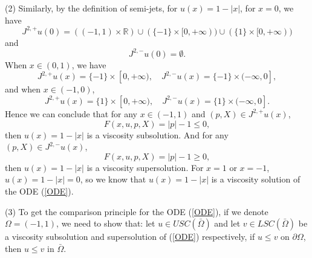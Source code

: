 \documentclass[12pt,a4paper]{ctexart}
\begin{document}
(2) Similarly, by the definition of semi-jets, for $u(x) = 1 - |x|$, for $x = 0$, we have
\begin{equation*}
    J^{2,+} u(0) = ((-1, 1) \times \mathbb{R}) \cup (\{-1 \} \times [0, + \infty)) \cup (\{1\} \times  [0, + \infty) )
\end{equation*}
and 
\begin{equation*}
    J^{2,-} u(0) = \emptyset.
\end{equation*}
When $x \in (0,1)$, we have
\begin{equation*}
    J^{2,+} u(x) = \{- 1\} \times [0, + \infty), \quad J^{2, -} u(x) = \{-1 \} \times (- \infty, 0],
\end{equation*}
and when $x \in (-1, 0)$, 
\begin{equation*}
    J^{2,+} u(x) = \{1\} \times [0, + \infty), \quad J^{2, -} u(x) = \{1 \} \times (- \infty, 0].
\end{equation*}
Hence we can conclude that for any $x \in (-1, 1)$ and $(p, X) \in J^{2,+} u(x)$,
\begin{equation*}
    F(x, u, p, X) = |p| - 1 \leq 0,
\end{equation*}
then $u(x) = 1 - |x|$ is a viscosity subsolution. And for any $(p, X) \in J^{2,-} u(x)$,
\begin{equation*}
    F(x, u, p, X) = |p| - 1 \geq 0,
\end{equation*}
then $u(x) = 1 - |x|$ is a viscosity supersolution. For $x = 1$ or $x = -1$, $u(x) = 1 - |x| = 0$, so we know that $u(x) = 1 - |x|$ is a viscosity solution of the ODE (\ref{ODE}).

\vspace{4pt}

(3) To get the comparison principle for the ODE (\ref{ODE}), if we denote $\Omega = (-1, 1)$, we need to show that: let $u \in USC(\bar \Omega)$ and let $v \in LSC(\bar \Omega)$ be a viscosity subsolution and supersolution of (\ref{ODE}) respectively, if $u \leq v$ on $\partial \Omega$, then $u \leq v$ in $\bar \Omega$.
\end{document}
